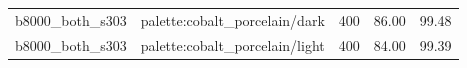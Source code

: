 \begin{longtable}{l>{\raggedright\arraybackslash}p{.42\linewidth}rrr}
b8000\_\allowbreak{}both\_\allowbreak{}s303 & %
palette:cobalt\_\allowbreak{}porcelain/dark & %
400 & %
86.00 & %
99.48 \\ %

b8000\_\allowbreak{}both\_\allowbreak{}s303 & %
palette:cobalt\_\allowbreak{}porcelain/light & %
400 & %
84.00 & %
99.39 \\ %


\end{longtable}
